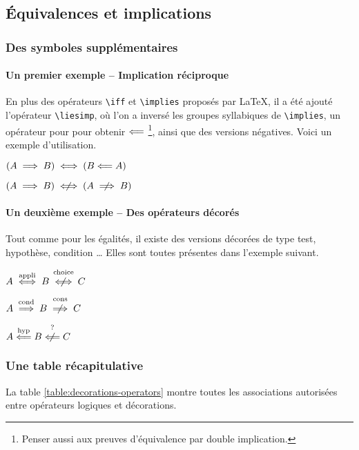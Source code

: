 \documentclass[12pt,a4paper]{article}
\newcommand\env[1]{\texttt{#1}}
\newcommand\macro[1]{\env{\textbackslash{}#1}}
\theoremstyle{definition}
\begin{document}
\subsection{Équivalences et implications}

\subsubsection{Des symboles supplémentaires}

\paragraph{Un premier exemple -- Implication réciproque}

En plus des opérateurs \macro{iff} et \macro{implies} proposés par \LaTeX{}, il a été ajouté l'opérateur \macro{liesimp}, où l'on a inversé les groupes syllabiques de \macro{implies}, un opérateur pour pour obtenir $\mathrel{\Longleftarrow}$
\footnote{
	Penser aussi aux preuves d'équivalence par double implication.
},
ainsi que des versions négatives. Voici un exemple d'utilisation.

\begin{latexex}
$(A \implies B)
 \iff (B \mathrel{\Longleftarrow} A)$

$(A \implies B)
 \notiff (A \notimplies B)$
\end{latexex}




\paragraph{Un deuxième exemple -- Des opérateurs décorés}

Tout comme pour les égalités, il existe des versions décorées de type test, hypothèse, condition \dots{} 
Elles sont toutes présentes dans l'exemple suivant.

\begin{latexex}
$A \iffappli B \notiffchoice C$

$A \impliescond B \notimpliescons C$

$A \liesimphyp B \notliesimptest C$
\end{latexex}


\subsubsection{Une table récapitulative}

La table \ref{table:decorations-operators}  montre toutes les associations autorisées entre opérateurs logiques et décorations.
\end{document}
